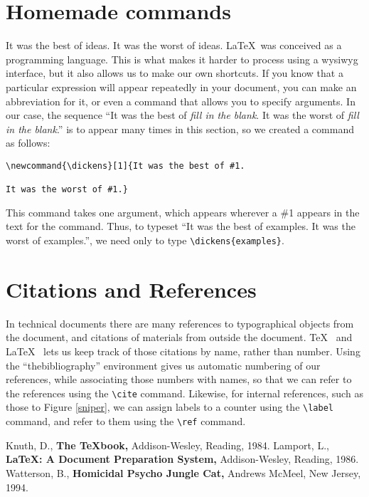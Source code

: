 \documentclass[12pt]{article}
\begin{document}
\section{Homemade commands}
\newcommand{\dickens}[1]{It was the best of #1. It was the worst of #1.}
\dickens{ideas}
\LaTeX\ was conceived as a programming language.
This is what makes it
harder to process using a wysiwyg interface, but it also allows
us to make our own shortcuts.
If you know that a particular expression will appear repeatedly
in your document, you can make an abbreviation for it, or even
a command that allows you to specify arguments.
In our case,
the sequence ``\dickens{{\it fill in the blank}}''
is to appear many times in this section, so we created a command
as follows:
\begin{verbatim}
\newcommand{\dickens}[1]{It was the best of #1.

It was the worst of #1.}
\end{verbatim}
This command takes one argument, which appears wherever a \#1 appears
in the text for the command.
Thus, to typeset ``\dickens{examples}'',
we need only to type \verb(\dickens{examples}(.

\section{Citations and References}
In technical documents there are many references to 
typographical objects from the document, and citations
of materials from outside the document.
\TeX\ \cite{knuth}
and \LaTeX\ \cite{lamport} lets us keep track of those citations
by name, rather than number.
Using the ``thebibliography'' 
environment gives us automatic numbering of our references,
while associating those numbers with names, so that we can
refer to the references using the \verb(\cite( command.
Likewise, for internal references, such as those to Figure \ref{sniper},
we can assign labels to a counter using the \verb(\label(
command, and refer to them using the \verb(\ref( command.

\begin{thebibliography}{X}
     Knuth, D., {\bf The \TeX book,} Addison-Wesley, Reading, 1984.
     Lamport, L., {\bf \LaTeX: A Document Preparation System,}
    Addison-Wesley, Reading, 1986.
     Watterson, B., {\bf Homicidal Psycho Jungle Cat,}
    Andrews McMeel, New Jersey, 1994.
\end{thebibliography}
\end{document}
